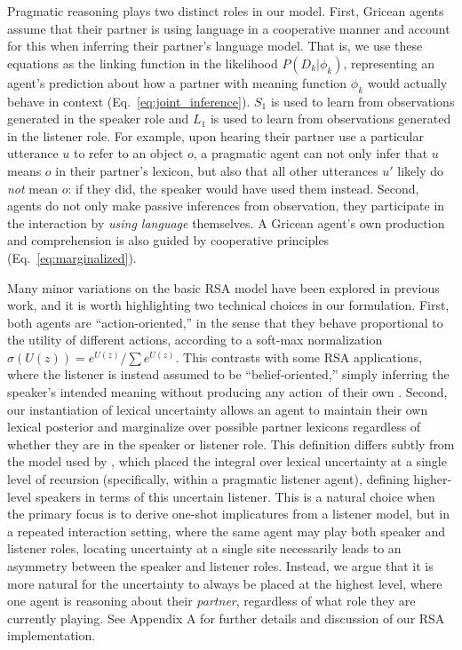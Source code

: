 Pragmatic reasoning plays two distinct roles in our model.
First, Gricean agents assume that their partner is using language in a cooperative manner and account for this when inferring their partner's language model.
That is, we use these equations as the linking function in the likelihood $P(D_k | \phi_k)$, representing an agent's prediction about how a partner with meaning function $\phi_k$ would actually behave in context (Eq.~\ref{eq:joint_inference}). 
$S_1$ is used to learn from observations generated in the speaker role and $L_1$ is used to learn from observations generated in the listener role.
For example, upon hearing their partner use a particular utterance $u$ to refer to an object $o$, a pragmatic agent can not only infer that $u$ means $o$ in their partner's lexicon, but also that all other utterances $u'$ likely do \emph{not} mean $o$: if they did, the speaker would have used them instead.
Second, agents do not only make passive inferences from observation, they participate in the interaction by \emph{using language} themselves.
A Gricean agent's own production and comprehension is also guided by cooperative principles (Eq.~\ref{eq:marginalized}).

Many minor variations on the basic RSA model have been explored in previous work, and it is worth highlighting two technical choices in our formulation.
First, both agents are ``action-oriented,'' in the sense that they behave proportional to the utility of different actions, according to a soft-max normalization $\sigma(U(z)) = e^{U(z)}/\sum e^{U(z)}$.
This contrasts with some RSA applications, where the listener is instead assumed to be ``belief-oriented,'' simply inferring the speaker's intended meaning without producing any action of their own \cite{qing2015variations}.
Second, our instantiation of lexical uncertainty allows an agent to maintain their own lexical posterior and marginalize over possible partner lexicons regardless of whether they are in the speaker or listener role.
This definition differs subtly from the model used by , which placed the integral over lexical uncertainty at a single level of recursion (specifically, within a pragmatic listener agent), defining higher-level speakers in terms of this uncertain listener.
This is a natural choice when the primary focus is to derive one-shot implicatures from a listener model, but in a repeated interaction setting, where the same agent may play both speaker and listener roles, locating uncertainty at a single site necessarily leads to an asymmetry between the speaker and listener roles. 
Instead, we argue that it is more natural for the uncertainty to always be placed at the highest level, where one agent is reasoning about their \emph{partner}, regardless of what role they are currently playing.
See Appendix A for further details and discussion of our RSA implementation.

